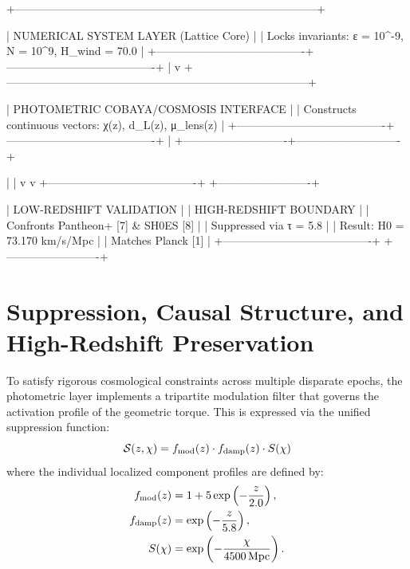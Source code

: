 +---------------------------------------------------------------------------------+

|                       NUMERICAL SYSTEM LAYER (Lattice Core)                     |
|            Locks invariants: ε = 10^-9, N = 10^9, H_wind = 70.0                 |
+----------------------------------------+----------------------------------------+
                                         |
                                         v
+---------------------------------------------------------------------------------+

|                    PHOTOMETRIC COBAYA/COSMOSIS INTERFACE                        |
|            Constructs continuous vectors: χ(z), d_L(z), μ_lens(z)               |
+----------------------------------------+----------------------------------------+
                                         |
            +----------------------------+----------------------------+

            |                                                         |
            v                                                         v
+----------------------------------------+              +-------------------------+

|      LOW-REDSHIFT VALIDATION           |              | HIGH-REDSHIFT BOUNDARY  |
|  Confronts Pantheon+ [7] & SH0ES [8]   |              | Suppressed via τ = 5.8  |
|  Result: H0 = 73.170 km/s/Mpc          |              | Matches Planck [1]      |
+----------------------------------------+              +-------------------------+

\section{Suppression, Causal Structure, and High-Redshift Preservation}

To satisfy rigorous cosmological constraints across multiple disparate epochs, the photometric layer implements a tripartite modulation filter that governs the activation profile of the geometric torque. This is expressed via the unified suppression function:
\begin{equation}
\mathcal{S}(z, \chi) = f_{\rm mod}(z) \cdot f_{\rm damp}(z) \cdot S(\chi)
\end{equation}
where the individual localized component profiles are defined by:
\begin{align}
f_{\rm mod}(z) &= 1 + 5\exp\left(-\frac{z}{2.0}\right), \\
f_{\rm damp}(z) &= \exp\left(-\frac{z}{5.8}\right), \\
S(\chi) &= \exp\left(-\frac{\chi}{4500\,{\rm Mpc}}\right).
\end{align}

